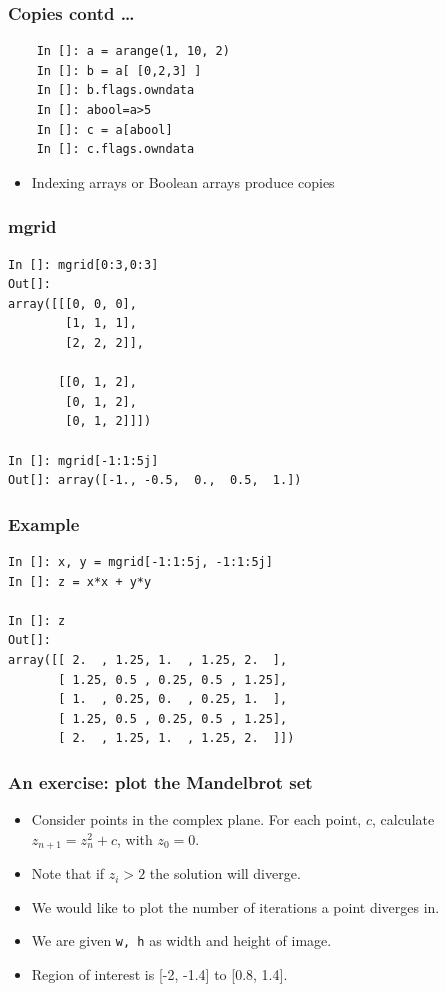 \documentclass[14pt,compress]{beamer}
\newcounter{time}
\newcommand{\inctime}[1]{\addtocounter{time}{#1}{\tiny \thetime\ m}}
\newcommand{\typ}[1]{\lstinline{#1}}
\begin{document}
\begin{frame}[fragile]
  \frametitle{Copies contd \ldots}
  \begin{lstlisting}
    In []: a = arange(1, 10, 2)
    In []: b = a[ [0,2,3] ]
    In []: b.flags.owndata
    In []: abool=a>5
    In []: c = a[abool]
    In []: c.flags.owndata
  \end{lstlisting}
  \begin{itemize}
  \item Indexing arrays or Boolean arrays produce copies
  \end{itemize}
\end{frame}

\begin{frame}[fragile]
  \frametitle{mgrid}
  \begin{lstlisting}
In []: mgrid[0:3,0:3]
Out[]: 
array([[[0, 0, 0],
        [1, 1, 1],
        [2, 2, 2]],

       [[0, 1, 2],
        [0, 1, 2],
        [0, 1, 2]]])

In []: mgrid[-1:1:5j]
Out[]: array([-1., -0.5,  0.,  0.5,  1.])
\end{lstlisting}
\end{frame}

\begin{frame}[fragile]
  \frametitle{Example}
  \begin{lstlisting}
In []: x, y = mgrid[-1:1:5j, -1:1:5j]
In []: z = x*x + y*y

In []: z
Out[]: 
array([[ 2.  , 1.25, 1.  , 1.25, 2.  ],
       [ 1.25, 0.5 , 0.25, 0.5 , 1.25],
       [ 1.  , 0.25, 0.  , 0.25, 1.  ],
       [ 1.25, 0.5 , 0.25, 0.5 , 1.25],
       [ 2.  , 1.25, 1.  , 1.25, 2.  ]])
\end{lstlisting}
\inctime{10}
\end{frame}


\begin{frame}[fragile]
  \frametitle{An exercise: plot the Mandelbrot set}

  \begin{itemize}
      \item Consider points in the complex plane.  For each point, $c$,
          calculate $z_{n+1} = z_n^2 + c$, with $z_0 = 0$.  
          
      \item Note that if $z_i > 2$ the solution will diverge.  
          
      \item We would like to plot the number of iterations a point
          diverges in.

      \item We are given \typ{w, h} as width and height of image.

      \item Region of interest is [-2, -1.4] to [0.8, 1.4].

  \end{itemize}




\end{frame}
\end{document}

